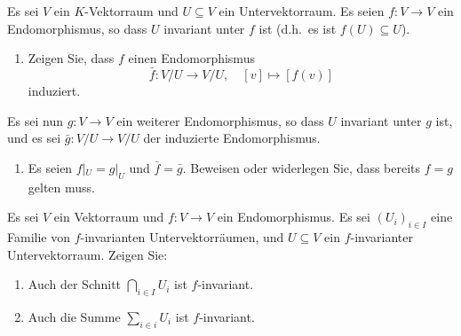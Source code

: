 \documentclass[a4paper,10pt]{scrartcl}
\begin{document}
\begin{question}
  Es sei $V$ ein $K$-Vektorraum und $U \subseteq V$ ein Untervektorraum.
  Es seien $f \colon V \to V$ ein Endomorphismus, so dass $U$ invariant unter $f$ ist (d.h.\ es ist $f(U) \subseteq U$).
  \begin{enumerate}
    \item
      Zeigen Sie, dass $f$ einen Endomorphismus
      \[
        \bar{f} \colon V\!/U \to V\!/U,
        \quad
        [v] \mapsto [f(v)]
      \]
    induziert.
  \end{enumerate}
  Es sei nun $g \colon V \to V$ ein weiterer Endomorphismus, so dass $U$ invariant unter $g$ ist, und es sei $\bar{g} \colon V\!/U \to V\!/U$ der induzierte Endomorphismus.
  \begin{enumerate}[resume]
    \item
      Es seien $f|_U = g|_U$ und $\bar{f} = \bar{g}$.
      Beweisen oder widerlegen Sie, dass bereits $f = g$ gelten muss.
  \end{enumerate}
\end{question}


\begin{question}
  Es sei $V$ ein Vektorraum und $f \colon V \to V$ ein Endomorphismus.
  Es sei $(U_i)_{i \in I}$ eine Familie von $f$-invarianten Untervektorräumen, und $U \subseteq V$ ein $f$-invarianter Untervektorraum.
  Zeigen Sie:
  \begin{enumerate}[leftmargin=*]
    \item
      Auch der Schnitt $\bigcap_{i \in I} U_i$ ist $f$-invariant.
    \item
      Auch die Summe $\sum_{i \in i} U_i$ ist $f$-invariant.
  \end{enumerate}
\end{question}
\end{document}
